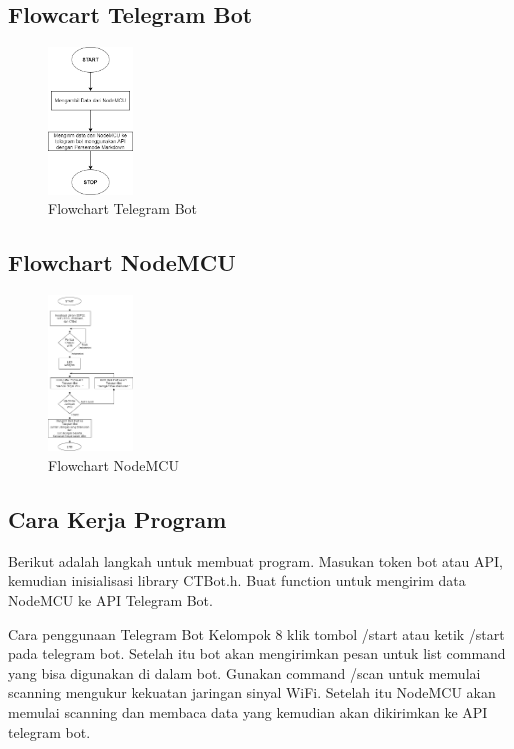 \documentclass[conference]{IEEEtran}
\begin{document}
\subsection{Flowcart Telegram Bot}
\begin{figure}[h]
    \centering
    \includegraphics[width=0.2\textwidth]{Flowchart telegram bot.png}
    \caption{Flowchart Telegram Bot}
\end{figure}
\vspace{0cm}

\subsection{Flowchart NodeMCU}
\begin{figure}[h]
    \centering
    \includegraphics[width=0.2\textwidth]{Flowchart NodeMCU telegram bot.png}
    \caption{Flowchart NodeMCU}
\end{figure}
\vspace{0cm}
\subsection{Cara Kerja Program}
Berikut adalah langkah untuk membuat program. Masukan token bot atau API, kemudian inisialisasi library CTBot.h. Buat function untuk mengirim data NodeMCU ke API Telegram Bot.

Cara penggunaan Telegram Bot Kelompok 8 klik tombol /start atau ketik /start pada telegram bot. Setelah itu bot akan mengirimkan pesan untuk list command yang bisa digunakan di dalam bot.
Gunakan command /scan untuk memulai scanning mengukur kekuatan jaringan sinyal WiFi.
Setelah itu NodeMCU akan memulai scanning dan membaca data yang kemudian akan dikirimkan ke API telegram bot.
\end{document}
